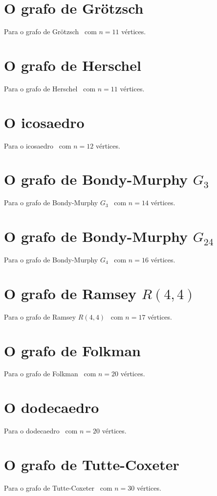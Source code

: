 \section{O grafo de Grötzsch}
Para o grafo de Grötzsch~\cite{cite:example-grotzsch} com $n=11$
vértices.

\section{O grafo de Herschel}
Para o grafo de Herschel~\cite{cite:example-herschel} com $n=11$
vértices.

\section{O icosaedro}
Para o icosaedro~\cite{cite:example-plato} com $n=12$ vértices.

\section{O grafo de Bondy-Murphy $G_3$}
Para o grafo de Bondy-Murphy $G_3$~\cite{cite:example-bondy} com $n=14$
vértices.

\section{O grafo de Bondy-Murphy $G_24$}
Para o grafo de Bondy-Murphy $G_4$~\cite{cite:example-bondy} com $n=16$
vértices.

\section{O grafo de Ramsey $R(4,4)$}
Para o grafo de Ramsey $R(4,4)$~\cite{cite:example-ramsey} com $n=17$
vértices.

\section{O grafo de Folkman}
Para o grafo de Folkman~\cite{cite:example-folkman} com $n=20$
vértices.

\section{O dodecaedro}
Para o dodecaedro~\cite{cite:example-plato} com $n=20$ vértices.

\section{O grafo de Tutte-Coxeter}
Para o grafo de Tutte-Coxeter~\cite{cite:example-tutte} com $n=30$
vértices.

